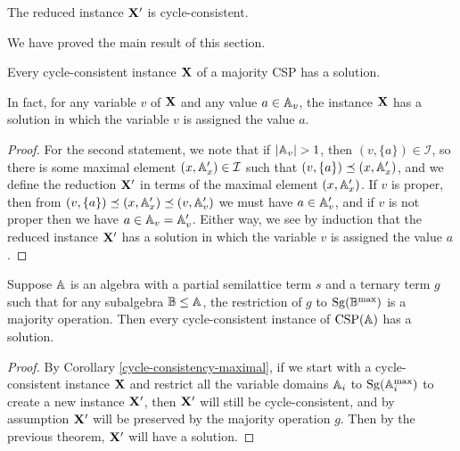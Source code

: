 \documentclass[letterpaper,11pt]{article}
\DeclareMathOperator{\CSP}{CSP}
\DeclareMathOperator{\Sg}{Sg}
\begin{document}
\begin{cor} The reduced instance $\mathbf{X}'$ is cycle-consistent.
\end{cor}

We have proved the main result of this section.

\begin{thm} Every cycle-consistent instance $\mathbf{X}$ of a majority CSP has a solution.

In fact, for any variable $v$ of $\mathbf{X}$ and any value $a \in \mathbb{A}_v$, the instance $\mathbf{X}$ has a solution in which the variable $v$ is assigned the value $a$.
\end{thm}
\begin{proof} For the second statement, we note that if $|\mathbb{A}_v| > 1$, then $(v,\{a\}) \in \mathcal{I}$, so there is some maximal element $(x,\mathbb{A}_x') \in \mathcal{I}$ such that $(v,\{a\}) \preceq (x,\mathbb{A}_x')$, and we define the reduction $\mathbf{X}'$ in terms of the maximal element $(x,\mathbb{A}_x')$. If $v$ is proper, then from $(v,\{a\}) \preceq (x,\mathbb{A}_x') \preceq (v,\mathbb{A}_v')$ we must have $a \in \mathbb{A}_v'$, and if $v$ is not proper then we have $a \in \mathbb{A}_v = \mathbb{A}_v'$. Either way, we see by induction that the reduced instance $\mathbf{X}'$ has a solution in which the variable $v$ is assigned the value $a$.
\end{proof}

\begin{cor} Suppose $\mathbb{A}$ is an algebra with a partial semilattice term $s$ and a ternary term $g$ such that for any subalgebra $\mathbb{B} \le \mathbb{A}$, the restriction of $g$ to $\Sg(\bB^{\max})$ is a majority operation. Then every cycle-consistent instance of $\CSP(\bA)$ has a solution.
\end{cor}
\begin{proof} By Corollary \ref{cycle-consistency-maximal}, if we start with a cycle-consistent instance $\mathbf{X}$ and restrict all the variable domains $\mathbb{A}_i$ to $\Sg(\bA_i^{\max})$ to create a new instance $\mathbf{X}'$, then $\mathbf{X}'$ will still be cycle-consistent, and by assumption $\mathbf{X}'$ will be preserved by the majority operation $g$. Then by the previous theorem, $\mathbf{X}'$ will have a solution.
\end{proof}
\end{document}
